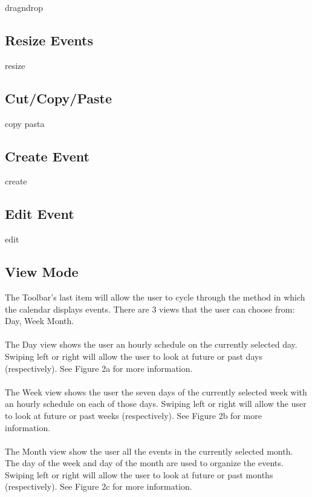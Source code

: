 \documentclass{scrreprt}
\begin{document}
dragndrop

\subsection{Resize Events}

resize

\subsection{Cut/Copy/Paste}

copy pasta

\subsection{Create Event}

create

\subsection{Edit Event}

edit

\subsection{View Mode}

The Toolbar's last item will allow the user to cycle through the method in which the calendar displays events.  There are 3 views that the user can choose from: Day, Week Month. \\
\\
The Day view shows the user an hourly schedule on the currently selected day.  Swiping left or right will allow the user to look at future or past days (respectively). See Figure 2a for more information. \\
\\
The Week view shows the user the seven days of the currently selected week with an hourly schedule on each of those days.  Swiping left or right will allow the user to look at future or past weeks (respectively). See Figure 2b for more information. \\
\\
The Month view show the user all the events in the currently selected month.  The day of the week and day of the month are used to organize the events.  Swiping left or right will allow the user to look at future or past months (respectively).  See Figure 2c for more information. \\
\\
\end{document}
